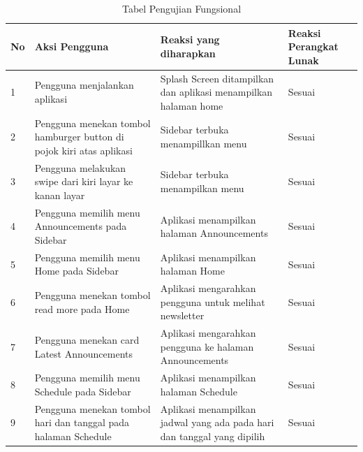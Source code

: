 \begin{table}[H]
\caption{Tabel Pengujian Fungsional}
\label{table:tabelPengujianFungsional}
\begin{tabular}{|p{0.3cm}|p{5.7cm}|p{5.7cm}|p{3cm}|}
\hline
No & Aksi Pengguna                                                                      & Reaksi yang diharapkan                                                               & Reaksi Perangkat Lunak \\ \hline
1  & Pengguna menjalankan aplikasi                                                      & Splash Screen ditampilkan dan aplikasi menampilkan halaman home                      & Sesuai                 \\ \hline
2  & Pengguna menekan tombol hamburger button di pojok kiri atas aplikasi               & Sidebar terbuka menampillkan menu                                                    & Sesuai                 \\ \hline
3  & Pengguna melakukan swipe dari kiri layar ke kanan layar                            & Sidebar terbuka menampilkan menu                                                     & Sesuai                 \\ \hline
4  & Pengguna memilih menu Announcements pada Sidebar                                   & Aplikasi menampilkan halaman Announcements                                         & Sesuai                 \\ \hline
5  & Pengguna memilih menu Home pada Sidebar                                            & Aplikasi menampilkan halaman Home                                                    & Sesuai                 \\ \hline
6  & Pengguna menekan tombol read more pada Home                                        & Aplikasi mengarahkan pengguna untuk melihat newsletter                               & Sesuai                 \\ \hline
7  & Pengguna menekan card Latest Announcements                                         & Aplikasi mengarahkan pengguna ke halaman Announcements                                & Sesuai                 \\ \hline
8  & Pengguna memilih menu Schedule pada Sidebar                                        & Aplikasi menampilkan halaman Schedule                                                & Sesuai                 \\ \hline
9  & Pengguna menekan tombol hari dan tanggal pada halaman Schedule                     & Aplikasi menampilkan jadwal yang ada pada hari dan tanggal yang dipilih              & Sesuai                 \\ \hline

\end{tabular}
\end{table}
